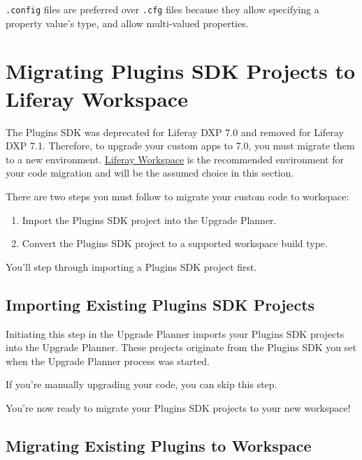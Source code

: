 \texttt{.config} files are preferred over \texttt{.cfg} files because
they allow specifying a property value's type, and allow multi-valued
properties.

\chapter{Migrating Plugins SDK Projects to Liferay
Workspace}\label{migrating-plugins-sdk-projects-to-liferay-workspace}

The Plugins SDK was deprecated for Liferay DXP 7.0 and removed for
Liferay DXP 7.1. Therefore, to upgrade your custom apps to 7.0, you must
migrate them to a new environment.
\href{/docs/7-2/reference/-/knowledge_base/r/liferay-workspace}{Liferay
Workspace} is the recommended environment for your code migration and
will be the assumed choice in this section.

There are two steps you must follow to migrate your custom code to
workspace:

\begin{enumerate}
\def\labelenumi{\arabic{enumi}.}
\item
  Import the Plugins SDK project into the Upgrade Planner.
\item
  Convert the Plugins SDK project to a supported workspace build type.
\end{enumerate}

You'll step through importing a Plugins SDK project first.

\section{Importing Existing Plugins SDK
Projects}\label{importing-existing-plugins-sdk-projects}

Initiating this step in the Upgrade Planner imports your Plugins SDK
projects into the Upgrade Planner. These projects originate from the
Plugins SDK you set when the Upgrade Planner process was started.

If you're manually upgrading your code, you can skip this step.

You're now ready to migrate your Plugins SDK projects to your new
workspace!

\section{Migrating Existing Plugins to
Workspace}\label{migrating-existing-plugins-to-workspace}

